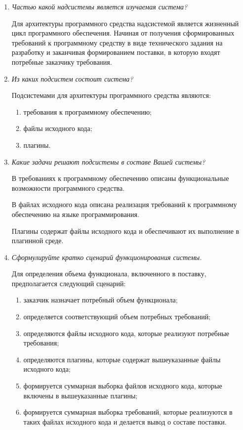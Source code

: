 \documentclass{article}
\begin{document}
\begin{enumerate}
        \item \textit{Частью какой надсистемы является изучаемая система?}

        Для архитектуры программного средства надсистемой является жизненный цикл программного обеспечения. Начиная от получения сформированных требований к программному средству в виде технического задания на разработку и заканчивая формированием поставки, в которую входят потребные заказчику требования.

        \item \textit{Из каких подсистем состоит система?}

        Подсистемами для архитектуры программного средства являются:
        \begin{enumerate}
            \item требования к программному обеспечению;
            \item файлы исходного кода;
            \item плагины.
        \end{enumerate}

        \item \textit{Какие задачи решают подсистемы в составе Вашей системы?}

        В требованиях к программному обеспечению описаны функциональные возможности программного средства.

        В файлах исходного кода описана реализация требований к программному обеспечению на языке программирования.

        Плагины содержат файлы исходного кода и обеспечивают их выполнение в плагинной среде.

        \item \textit{Сформулируйте кратко сценарий функционирования системы.}

        Для определения объема функционала, включенного в поставку, предполагается следующий сценарий:
        \begin{enumerate}
            \item заказчик назначает потребный объем функционала;
            \item определяется соответствующий объем потребных требований;
            \item определяются файлы исходного кода, которые реализуют потребные требования;
            \item определяются плагины, которые содержат вышеуказанные файлы исходного кода;
            \item формируется суммарная выборка файлов исходного кода, которые включены в вышеуказанные плагины;
            \item формируется суммарная выборка требований, которые реализуются в таких файлах исходного кода и делается вывод о составе поставки.
        \end{enumerate}


\end{enumerate}
\end{document}
